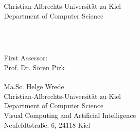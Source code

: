 
\begin{titlepage}

  \begin{center}    
      \LARGE Christian-Albrechts-Universität zu Kiel\\
      \vspace{0.2cm}
      \large Department of Computer Science\\ 
    \begin{LARGE}
    \vspace*{2.5cm}

    \vspace*{2.5cm}
    \doublespacing
    \bitType\\
    \vspace*{0.3cm}
    {\sffamily\bfseries\bitTitle}
    \singlespacing
    \end{LARGE}
    \vspace{-0.25cm}
    {\LARGE \bitAuthor}\\[1.5cm]
    \vfill
    {First Assessor:}\\[0.1cm] 
    {Prof. Dr. Sören Pirk}\\[0.1cm]
    {\bitZweitbetreuer}\\[0.1cm]
    {Ma.Sc. Helge Wrede}\\[0.5cm] 
    {\small Christian-Albrechts-Universität zu Kiel\\
			Department of Computer Science\\
			Visual Computing and Artificial Intelligence\\
		  	Neufeldtstraße. 6, 24118 Kiel
	}\\[0.5cm]
			
	{\bitDeadline}
  \end{center}
\end{titlepage} 
